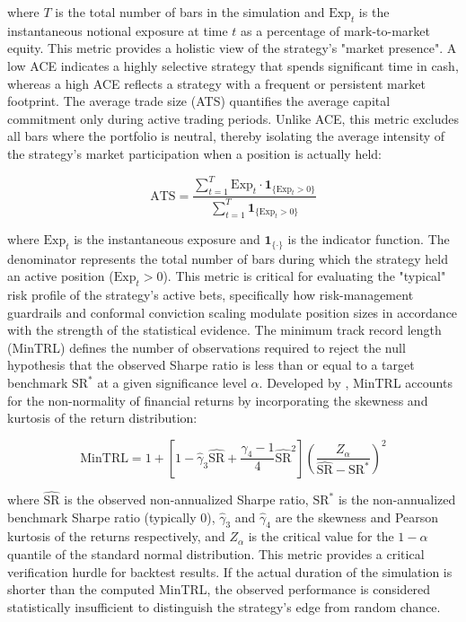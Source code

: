 \documentclass[12pt, a4paper]{article}
\begin{document}
where \(T\) is the total number of bars in the simulation and \(\text{Exp}_t\) is the instantaneous notional exposure at time \(t\) as a percentage of mark-to-market equity. 
This metric provides a holistic view of the strategy's "market presence". A low ACE indicates a highly selective strategy that spends significant time in cash, whereas a high ACE reflects 
a strategy with a frequent or persistent market footprint.
The average trade size (ATS) quantifies the average capital commitment only during active trading periods. Unlike ACE, this metric excludes all bars where the portfolio is neutral, 
thereby isolating the average intensity of the strategy's market participation when a position is actually held:

\begin{equation}
    \text{ATS} = \frac{\sum_{t=1}^{T} \text{Exp}_t \cdot \mathbf{1}_{\{\text{Exp}_t > 0\}}}{\sum_{t=1}^{T} \mathbf{1}_{\{\text{Exp}_t > 0\}}}
    \label{eq:avg_trade_size}
\end{equation}

where \(\text{Exp}_t\) is the instantaneous exposure and \(\mathbf{1}_{\{\cdot\}}\) is the indicator function. The denominator represents the total number of bars during which the 
strategy held an active position (\(\text{Exp}_t > 0\)). This metric is critical for evaluating the "typical" risk profile of the strategy's active bets, 
specifically how risk-management guardrails and conformal conviction scaling modulate position sizes in accordance with the strength of the statistical evidence.
The minimum track record length (MinTRL) defines the number of observations required to reject the null hypothesis that the observed Sharpe ratio is less than or equal to a target 
benchmark \(\text{SR}^*\) at a given significance level \(\alpha\). Developed by \textcite[see Eq. 13]{bailey_sharpe_2012}, MinTRL accounts for the non-normality of financial returns by 
incorporating the skewness and kurtosis of the return distribution:

\begin{equation}
    \text{MinTRL} = 1 + \left[ 1 - \hat{\gamma}_3 \widehat{\text{SR}} + \frac{\hat{\gamma}_4 - 1}{4} \widehat{\text{SR}}^2 \right] \left( \frac{Z_{\alpha}}{\widehat{\text{SR}} - \text{SR}^*} \right)^2
    \label{eq:mintrl}
\end{equation}

where \(\widehat{\text{SR}}\) is the observed non-annualized Sharpe ratio, \(\text{SR}^*\) is the non-annualized benchmark Sharpe ratio (typically 0), 
\(\hat{\gamma}_3\) and \(\hat{\gamma}_4\) are the skewness and Pearson kurtosis of the returns respectively, and \(Z_{\alpha}\) is the critical value for the \(1-\alpha\) quantile of the 
standard normal distribution. This metric provides a critical verification hurdle for backtest results. If the actual duration of the simulation is shorter than the computed MinTRL, 
the observed performance is considered statistically insufficient to distinguish the strategy's edge from random chance.
\end{document}
